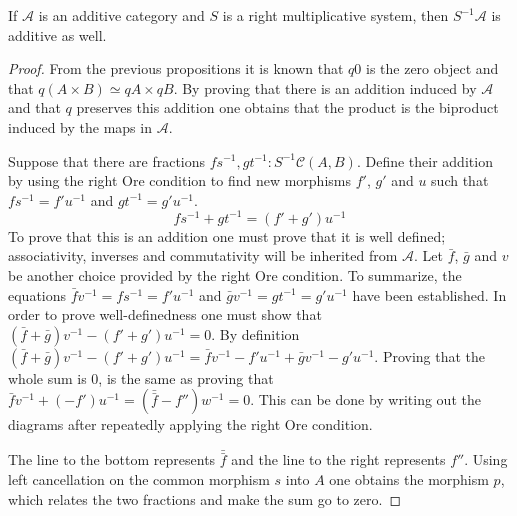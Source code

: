     \begin{prop}
        If $\mathcal{A}$ is an additive category and $S$ is a right multiplicative system, then $S^{-1}\mathcal{A}$ is additive as well.
    \end{prop}

    \begin{proof}
        From the previous propositions it is known that $q0$ is the zero object and that $q(A\times B)\simeq qA\times qB$. By proving that there is an addition induced by $\mathcal{A}$ and that $q$ preserves this addition one obtains that the product is the biproduct induced by the maps in $\mathcal{A}$.

        Suppose that there are fractions $fs^{-1}, gt^{-1}:S^{-1}\mathcal{C}(A,B)$. Define their addition by using the right Ore condition to find new morphisms $f'$, $g'$ and $u$ such that $fs^{-1} = f'u^{-1}$ and $gt^{-1} = g'u^{-1}$.
        \begin{equation*}
            fs^{-1}+gt^{-1} = (f'+g')u^{-1}
        \end{equation*}
        To prove that this is an addition one must prove that it is well defined; associativity, inverses and commutativity will be inherited from $\mathcal{A}$.
        Let $\bar{f}$, $\bar{g}$ and $v$ be another choice provided by the right Ore condition. To summarize, the equations $\bar{f}v^{-1}=fs^{-1}=f'u^{-1}$ and $\bar{g}v^{-1}=gt^{-1}=g'u^{-1}$ have been established. In order to prove well-definedness one must show that $(\bar{f}+\bar{g})v^{-1}-(f'+g')u^{-1}=0$. By definition $(\bar{f}+\bar{g})v^{-1}-(f'+g')u^{-1}=\bar{f}v^{-1}-f'u^{-1}+\bar{g}v^{-1}-g'u^{-1}$. Proving that the whole sum is $0$, is the same as proving that $\bar{f}v^{-1}+(-f')u^{-1}=(\bar{\bar{f}}-f'')w^{-1}=0$. This can be done by writing out the diagrams after repeatedly applying the right Ore condition.
        \begin{center}
        \end{center}
        The line to the bottom represents $\bar{\bar{f}}$ and the line to the right represents $f''$. Using left cancellation on the common morphism $s$ into $A$ one obtains the morphism $p$, which relates the two fractions and make the sum go to zero.


\end{proof}
